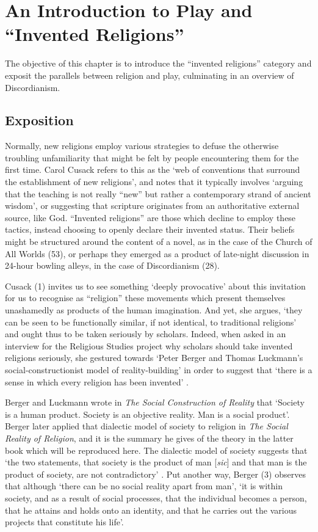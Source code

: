 \documentclass[Draft.tex]{subfiles}
\begin{document}
\chapter{An Introduction to Play and ``Invented Religions''}

The objective of this chapter is to introduce
the ``invented religions'' category
and exposit the parallels between religion and play,
culminating in an overview of Discordianism.

\section*{Exposition}
Normally, new religions employ various strategies
to defuse the otherwise troubling unfamiliarity
that might be felt by people encountering them for the first time.
Carol Cusack \parencite*[1]{Cusack10} refers to this as the
`web of conventions that surround the establishment of new religions',
and notes that it typically involves
`arguing that the teaching is not really ``new'' but rather
a contemporary strand of ancient wisdom',
or suggesting that scripture originates from
an authoritative external source, like God.
``Invented religions'' are those which decline to employ these tactics,
instead choosing to openly declare their invented status.
Their beliefs might be structured around the content of a novel,
as in the case of the Church of All Worlds (53),
or perhaps they emerged as a product of late-night discussion in
24-hour bowling alleys, in the case of Discordianism (28).

Cusack (1) invites us to see something `deeply provocative'
about this invitation for us to recognise as ``religion''
these movements which present themselves unashamedly as
products of the human imagination.
And yet, she argues, `they can be seen to be functionally similar,
if not identical, to traditional religions'
and ought thus to be taken seriously by scholars.
Indeed, when asked in an interview for the Religious Studies project
why scholars should take invented religions seriously,
she  gestured towards `Peter Berger and Thomas Luckmann’s
social-constructionist model of reality-building' in order to suggest
that `there is a sense in which every religion has been invented'
\parencite*{CusackPodcast}.

Berger and Luckmann \parencite*[79]{Berger67} wrote in
\textit{The Social Construction of Reality} that
`Society is a human product. Society is an objective reality.
Man is a social product'.
Berger later applied that dialectic model of society to religion
in \textit{The Social Reality of Religion},
and it is the summary he gives of the theory
in the latter book which will be reproduced here.
The dialectic model of society suggests that
`the two statements, that society is the product of man
[\textit{sic}] and that
man is the product of society, are not contradictory'
\parencite[3]{Berger69}.
Put another way, Berger (3) observes that although
`there can be no social reality apart from man',
`it is within society, and as a result of social processes,
that the individual becomes a person,
that he attains and holds onto an identity,
and that he carries out the various projects that constitute his life'.
\end{document}
